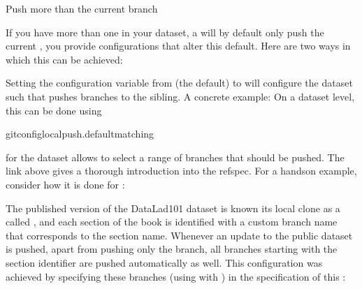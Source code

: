 \ignorespaces \begin{findoutmore}[label={fom-push-branch}, before title={\thetcbcounter\ }, float, floatplacement=tb, check odd page=true]{Push more than the current branch}
\label{\detokenize{basics/101-141-push:fom-push-branch}}

\sphinxAtStartPar
If you have more than one {\hyperref[\detokenize{glossary:term-branch}]{}} in your
dataset, a  will by default only push
the current {\hyperref[\detokenize{glossary:term-branch}]{}},  you provide configurations that alter
this default. Here are two ways in which this can be achieved:

\sphinxAtStartPar
{} Setting the  configuration variable from
 (the default) to  will configure the dataset such that
 pushes  branches to the sibling.
A concrete example: On a dataset level, this can be done using

\begin{sphinxVerbatim}[commandchars=\\\{\}]
gitconfig\PYGZhy{}\PYGZhy{}localpush.defaultmatching
\end{sphinxVerbatim}

\sphinxAtStartPar
{}
 for the dataset allows to
select a range of branches that should be pushed. The link above gives a
thorough introduction into the refspec. For a hands\sphinxhyphen{}on example, consider how it is done for
:

\sphinxAtStartPar
The published version of the DataLad\sphinxhyphen{}101 dataset is known its local clone
as a {\hyperref[\detokenize{glossary:term-remote}]{}} called , and each section of the book is identified
with a custom branch name that corresponds to the section name. Whenever an
update to the public dataset is pushed, apart from pushing only the 
branch, all branches starting with the section identifier  are pushed
automatically as well. This configuration was achieved by specifying these branches
(using {\hyperref[\detokenize{glossary:term-globbing}]{}} with \sphinxcode{\sphinxupquote{*}}) in the  specification of this {\hyperref[\detokenize{glossary:term-remote}]{}}:


\end{findoutmore}
